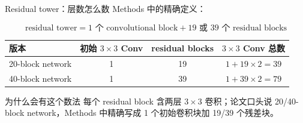 \documentclass[UTF8,aspectratio=169,10pt]{ctexbeamer}
\begin{document}
\begin{frame}{Residual tower：层数怎么数}
  \small
  Methods 中的精确定义：

  \[
    \text{residual tower}
    =
    \text{1 个 convolutional block}
    +
    \text{19 或 39 个 residual blocks}
  \]

  \begin{center}
    \begin{tabular}{@{}lccc@{}}
      \toprule
      版本 & 初始 $3\times3$ Conv & residual blocks & $3\times3$ Conv 总数 \\
      \midrule
      20-block network & 1 & 19 & $1+19\times2=39$ \\
      40-block network & 1 & 39 & $1+39\times2=79$ \\
      \bottomrule
    \end{tabular}
  \end{center}

  \begin{block}{为什么会有这个数法}
    每个 residual block 含两层 $3\times3$ 卷积；论文口头说 20/40-block network，Methods 中精确写成 1 个初始卷积块加 19/39 个残差块。
  \end{block}
\end{frame}
\end{document}
